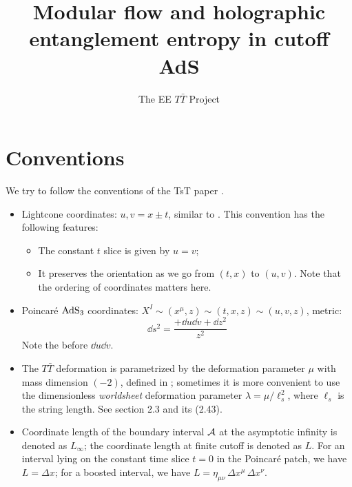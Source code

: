 \documentclass[11pt,a4paper]{article}
\title{Modular flow and holographic entanglement entropy in cutoff AdS}
\author[a]{The EE $T\bar{T}$ Project}
\affiliation[a]{Yau Mathematical Sciences Center, Tsinghua University, Beijing 100084, China}
\begin{document}
\maketitle

\setlength{\parskip}{.5\baselineskip}

\addtocounter{section}{-1}
\section{Conventions}
	We try to follow the conventions of the TsT paper \textcite{Apolo:2019zai}. 
	\begin{itemize}
	\item Lightcone coordinates: $u,v = x\pm t$, similar to \cite{Apolo:2019zai}. This convention has the following features:
	
		\begin{itemize}
		\item The constant $t$ slice is given by $u = v$;
		\item It preserves the orientation as we go from $(t,x)$ to $(u,v)$. Note that the ordering of coordinates matters here.
		\end{itemize}
	
	\item Poincar\'e $\mathrm{AdS}_3$ coordinates: $
			X^I \sim (x^\mu,z) \sim (t,x,z) \sim (u,v,z)
		$, metric: 
	\begin{equation}
		\dd{s}^2
		= \frac{+\dd{u} \dd{v} + \dd{z}^2}{z^2}
	\end{equation}
	Note the \mquote{+} before $\dd{u} \dd{v}$. 
	
	\item The $T\bar{T}$ deformation is parametrized by the deformation parameter $\mu$ with mass dimension $(-2)$, defined in \cite{Apolo:2019zai}; sometimes it is more convenient to use the dimensionless \textit{worldsheet} deformation parameter $\lambda = \mu/\ell_s^2$, where $\ell_s$ is the string length. See \cite{Apolo:2019zai} section 2.3 and its (2.43). 
	
	\item Coordinate length of the boundary interval $\mathcal{A}$ at the asymptotic infinity is denoted as $L_\infty$; the coordinate length at finite cutoff is denoted as $L$. For an interval lying on the constant time slice $t = 0$ in the Poincar\'e patch, we have $L = \Delta x$; for a boosted interval, we have $
		L = \eta_{\mu\nu}\, \Delta x^\mu\, \Delta x^\nu
	$. 
	\end{itemize}
	
\end{document}
